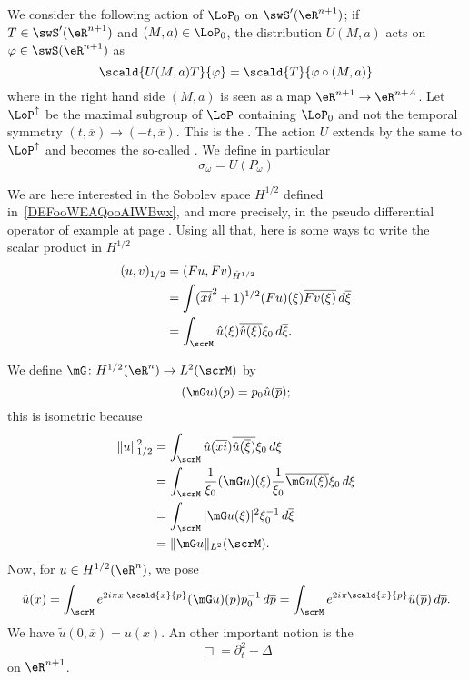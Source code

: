 We consider the following action of $\LoP_0$ on $\swS'(\eR^{n+1})$; if $T\in\swS'(\eR^{n+1})$ and $(M,a)\in\LoP_0$, the distribution $U(M,a)$ acts on $\varphi\in\swS(\eR^{n+1})$ as
\begin{equation}
	\scald{ U(M,a)T }{ \varphi }=\scald{ T }{ \varphi\circ(M,a) }
\end{equation}
where in the right hand side $(M,a)$ is seen as a map $\eR^{n+1}\to\eR^{n+A}$. Let $\LoP^{\uparrow}$ be the maximal subgroup of $\LoP$ containing $\LoP_0$ and not the temporal symmetry $(t,\overline{x})\to(-t,\overline{x})$. This is the . The action $U$ extends by the same to $\LoP^{\uparrow}$ and becomes the so-called . We define in particular
\begin{equation}
\sigma_{\omega}=U(P_{\omega})
\end{equation}

We are here interested in the Sobolev space $H^{1/2}$ defined in~\ref{DEFooWEAQooAIWBwx}, and more precisely, in the pseudo differential operator of example at page \pageref{pg_exem_psdo}. Using all that, here is some ways to write the scalar product in $H^{1/2}$
\begin{equation}
\begin{split}
  (u,v)_{1/2}&=(Fu,Fv)_{\hat H^{1/2}}\\
		&=\int (\overline{xi}^2+1)^{1/2}(Fu)(\xi)\overline{ Fv(\xi) }\,d\overline{ \xi }\\
		&=\int_{\scrM}\hat u(\xi)\overline{ \hat v(\xi) }\xi_0\,d\overline{ \xi }.
\end{split}
\end{equation}

We define $\mG\colon H^{1/2}(\eR^n)\to L^2(\scrM)$ by
\begin{equation}
  (\mG u)(p)=p_0\hat u(\overline{p});
\end{equation}
this is isometric because
\[
\begin{split}
  \| u \|_{1/2}^2&=\int_{\scrM}\hat u(\overline{xi})\overline{ \hat u(\overline{ \xi }) }\xi_0\,d\xi\\
		&=\int_{\scrM}\frac{1}{ \xi_0 }(\mG u)(\xi)\frac{1}{ \xi_0 }\overline{ \mG u(\xi) }\xi_0\,d\xi\\
		&=\int_{\scrM}| \mG u(\xi) |^2\xi_0^{-1}\,d\overline{ \xi }\\
		&=\| \mG u \|_{L^2}(\scrM).
\end{split}
\]
Now, for $u\in H^{1/2}(\eR^n)$, we pose
\begin{equation}
  \tilde u(x)=\int_{\scrM} e^{2i\pi x\cdot\scald{ x }{ p } }(\mG u)(p)p_0^{-1}\,d\overline{p}
		=\int_{\scrM} e^{2i\pi\scald{ x }{ p }}\hat u(\overline{p})\,d\overline{p}.
\end{equation}
We have $\tilde u(0,\overline{x})=u(x)$. An other important notion is the 
\[
  \Box=\partial_t^2-\Delta
\]
on $\eR^{n+1}$.


